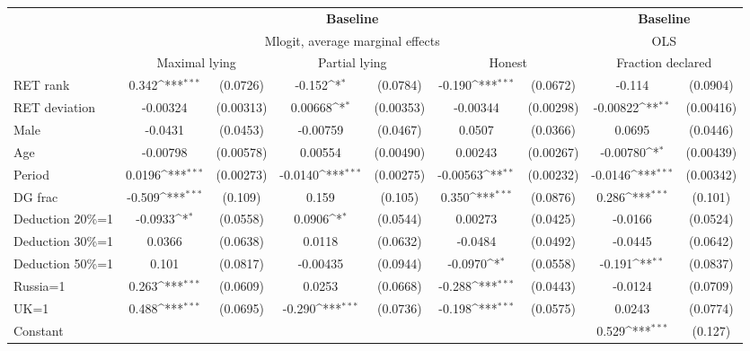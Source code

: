\def\sym#1{\ifmmode^{#1}\else\(^{#1}\)\fi}
\begin{tabular}{l|cccccc|cc}
\hline\hline
&\multicolumn{6}{c|}{\bf Baseline}&\multicolumn{2}{c}{\bf Baseline}\\ &\multicolumn{6}{c|}{Mlogit, average marginal effects }&\multicolumn{2}{c}{OLS}\\
                &\multicolumn{2}{c}{Maximal lying}&\multicolumn{2}{c}{Partial lying}&\multicolumn{2}{c}{Honest}  &\multicolumn{2}{c}{Fraction declared}\\
\hline
RET rank        &    0.342\sym{***}& (0.0726)&   -0.152\sym{*}  & (0.0784)&   -0.190\sym{***}& (0.0672)&   -0.114         & (0.0904)\\
RET deviation   & -0.00324         &(0.00313)&  0.00668\sym{*}  &(0.00353)& -0.00344         &(0.00298)& -0.00822\sym{**} &(0.00416)\\
Male            &  -0.0431         & (0.0453)& -0.00759         & (0.0467)&   0.0507         & (0.0366)&   0.0695         & (0.0446)\\
Age             & -0.00798         &(0.00578)&  0.00554         &(0.00490)&  0.00243         &(0.00267)& -0.00780\sym{*}  &(0.00439)\\
Period          &   0.0196\sym{***}&(0.00273)&  -0.0140\sym{***}&(0.00275)& -0.00563\sym{**} &(0.00232)&  -0.0146\sym{***}&(0.00342)\\
DG frac         &   -0.509\sym{***}&  (0.109)&    0.159         &  (0.105)&    0.350\sym{***}& (0.0876)&    0.286\sym{***}&  (0.101)\\
Deduction 20\%=1&  -0.0933\sym{*}  & (0.0558)&   0.0906\sym{*}  & (0.0544)&  0.00273         & (0.0425)&  -0.0166         & (0.0524)\\
Deduction 30\%=1&   0.0366         & (0.0638)&   0.0118         & (0.0632)&  -0.0484         & (0.0492)&  -0.0445         & (0.0642)\\
Deduction 50\%=1&    0.101         & (0.0817)& -0.00435         & (0.0944)&  -0.0970\sym{*}  & (0.0558)&   -0.191\sym{**} & (0.0837)\\
Russia=1        &    0.263\sym{***}& (0.0609)&   0.0253         & (0.0668)&   -0.288\sym{***}& (0.0443)&  -0.0124         & (0.0709)\\
UK=1            &    0.488\sym{***}& (0.0695)&   -0.290\sym{***}& (0.0736)&   -0.198\sym{***}& (0.0575)&   0.0243         & (0.0774)\\
Constant        &                  &         &                  &         &                  &         &    0.529\sym{***}&  (0.127)\\

\end{tabular}
